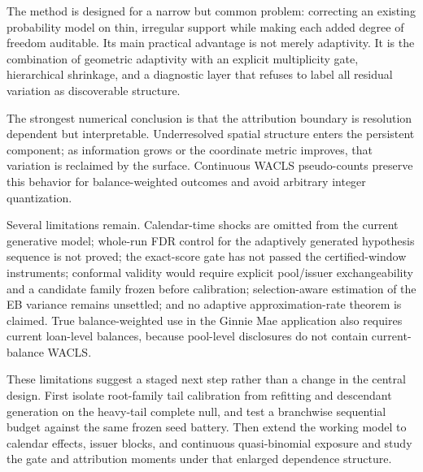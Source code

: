 \documentclass[11pt]{article}
\begin{document}
The method is designed for a narrow but common problem: correcting an existing probability model on
thin, irregular support while making each added degree of freedom auditable. Its main practical
advantage is not merely adaptivity. It is the combination of geometric adaptivity with an explicit
multiplicity gate, hierarchical shrinkage, and a diagnostic layer that refuses to label all residual
variation as discoverable structure.

The strongest numerical conclusion is that the attribution boundary is resolution dependent but
interpretable. Underresolved spatial structure enters the persistent component; as information grows
or the coordinate metric improves, that variation is reclaimed by the surface. Continuous WACLS
pseudo-counts preserve this behavior for balance-weighted outcomes and avoid arbitrary integer
quantization.

Several limitations remain. Calendar-time shocks are omitted from the current generative model;
whole-run FDR control for the adaptively generated hypothesis sequence is not proved; the exact-score
gate has not passed the certified-window instruments; conformal validity would require explicit
pool/issuer exchangeability and a candidate family frozen before calibration; selection-aware
estimation of the EB variance remains unsettled; and no adaptive approximation-rate theorem is
claimed. True balance-weighted use in the Ginnie Mae application also requires current loan-level
balances, because pool-level disclosures do not contain current-balance WACLS.

These limitations suggest a staged next step rather than a change in the central design.  First isolate
root-family tail calibration from refitting and descendant generation on the heavy-tail complete null,
and test a branchwise sequential budget against the same frozen seed battery.  Then extend the working
model to calendar effects, issuer blocks, and continuous quasi-binomial exposure and study the gate and
attribution moments under that enlarged dependence structure.
\end{document}
